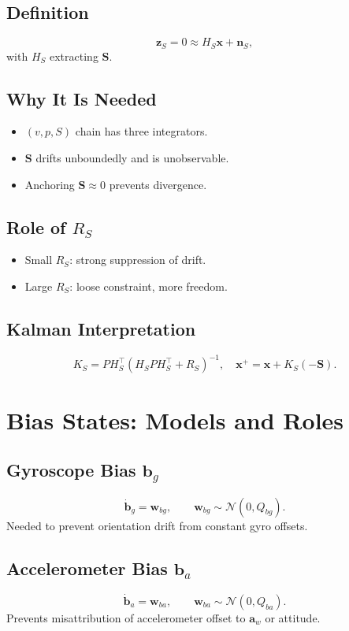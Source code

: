 \documentclass[11pt]{article}
\begin{document}
\subsection{Definition}
\[
\bm z_S = 0 \approx H_S \bm x + \bm n_S,
\]
with $H_S$ extracting $\bm S$.

\subsection{Why It Is Needed}
\begin{itemize}
\item $(v,p,S)$ chain has three integrators.
\item $\bm S$ drifts unboundedly and is unobservable.
\item Anchoring $\bm S\approx 0$ prevents divergence.
\end{itemize}

\subsection{Role of $R_S$}
\begin{itemize}
\item Small $R_S$: strong suppression of drift.
\item Large $R_S$: loose constraint, more freedom.
\end{itemize}

\subsection{Kalman Interpretation}
\[
K_S = P H_S^\top (H_S P H_S^\top + R_S)^{-1}, \quad
\bm x^+ = \bm x + K_S (-\bm S).
\]

\section{Bias States: Models and Roles}

\subsection{Gyroscope Bias $\bm b_g$}
\[
\dot{\bm b}_g = \bm w_{bg}, \qquad 
\bm w_{bg} \sim \mathcal{N}(0, Q_{bg}).
\]
Needed to prevent orientation drift from constant gyro offsets.

\subsection{Accelerometer Bias $\bm b_a$}
\[
\dot{\bm b}_a = \bm w_{ba}, \qquad 
\bm w_{ba} \sim \mathcal{N}(0, Q_{ba}).
\]
Prevents misattribution of accelerometer offset to $\bm a_w$ or attitude.
\end{document}
